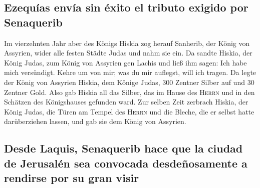 \hypertarget{ezequuxedas-envuxeda-sin-uxe9xito-el-tributo-exigido-por-senaquerib}{%
\subsection{Ezequías envía sin éxito el tributo exigido por
Senaquerib}\label{ezequuxedas-envuxeda-sin-uxe9xito-el-tributo-exigido-por-senaquerib}}

 Im vierzehnten Jahr aber des Königs Hiskia zog herauf
Sanherib, der König von Assyrien, wider alle festen Städte Judas und
nahm sie ein.  Da sandte Hiskia, der König Judas, zum
König von Assyrien gen Lachis und ließ ihm sagen: Ich habe mich
versündigt. Kehre um von mir; was du mir auflegst, will ich tragen. Da
legte der König von Assyrien Hiskia, dem Könige Judas, 300 Zentner
Silber auf und 30 Zentner Gold.  Also gab Hiskia all das
Silber, das im Hause des \textsc{Herrn} und in den Schätzen des
Königshauses gefunden ward.  Zur selben Zeit zerbrach
Hiskia, der König Judas, die Türen am Tempel des \textsc{Herrn} und die
Bleche, die er selbst hatte darüberziehen lassen, und gab sie dem König
von Assyrien.

\hypertarget{desde-laquis-senaquerib-hace-que-la-ciudad-de-jerusaluxe9n-sea-convocada-desdeuxf1osamente-a-rendirse-por-su-gran-visir}{%
\subsection{Desde Laquis, Senaquerib hace que la ciudad de Jerusalén sea
convocada desdeñosamente a rendirse por su gran
visir}\label{desde-laquis-senaquerib-hace-que-la-ciudad-de-jerusaluxe9n-sea-convocada-desdeuxf1osamente-a-rendirse-por-su-gran-visir}}

